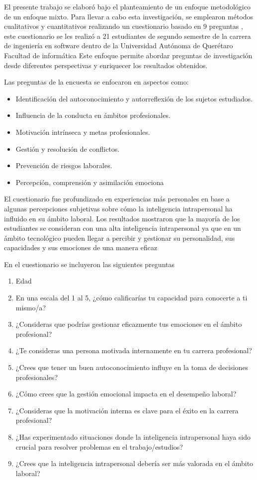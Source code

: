 El presente trabajo se elaboró bajo el planteamiento de un enfoque metodológico de un enfoque
mixto. Para llevar a cabo esta investigación, se emplearon métodos cualitativos y cuantitativos
realizando un cuestionario basado en 9 preguntas , este cuestionario se les realizó a 21 estudiantes
de segundo semestre de la carrera de ingeniería en software dentro de la Universidad Autónoma de
Querétaro Facultad de informática
Este enfoque permite abordar preguntas de investigación desde diferentes perspectivas y enriquecer
los resultados obtenidos.

Las preguntas de la encuesta se enfocaron en aspectos como:
\begin{itemize}
\item Identificación del autoconocimiento y autorreflexión de los sujetos estudiados.
\item Influencia de la conducta en ámbitos profesionales.
\item Motivación intrínseca y metas profesionales.
\item Gestión y resolución de conflictos.
\item Prevención de riesgos laborales.
\item Percepción, comprensión y asimilación emociona
\end{itemize}
El cuestionario fue profundizado en experiencias más personales en base a algunas percepciones
subjetivas sobre cómo la inteligencia intrapersonal ha influido en su ámbito laboral.
Los resultados mostraron que la mayoría de los estudiantes se consideran con una alta inteligencia
intrapersonal ya que en un ámbito tecnológico pueden llegar a percibir y gestionar su personalidad,
sus capacidades y sus emociones de una manera eficaz

En el cuestionario se incluyeron las siguientes preguntas
\begin{enumerate}
\item Edad
\item En una escala del 1 al 5, ¿cómo calificarías tu capacidad para conocerte a ti mismo/a?
\item ¿Consideras que podrías gestionar eficazmente tus emociones en el ámbito profesional?
\item ¿Te consideras una persona motivada internamente en tu carrera profesional?
\item ¿Crees que tener un buen autoconocimiento influye en la toma de decisiones profesionales?
\item ¿Cómo crees que la gestión emocional impacta en el desempeño laboral?
\item ¿Consideras que la motivación interna es clave para el éxito en la carrera profesional?
\item ¿Has experimentado situaciones donde la inteligencia intrapersonal haya sido crucial para resolver problemas en el trabajo/estudios?
\item ¿Crees que la inteligencia intrapersonal debería ser más valorada en el ámbito laboral?
\end{enumerate}

